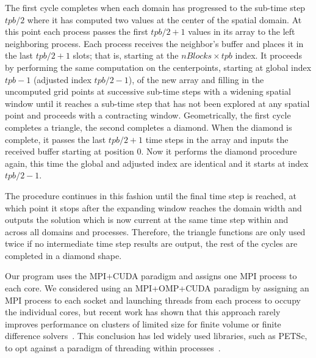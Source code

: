 The first cycle completes when each domain has progressed to the sub-time step $tpb/2$
where it has computed two values at the center of the spatial domain.
At this point each process passes the first $tpb/2 + 1$ values in its array to the left neighboring process.
Each process receives the neighbor's buffer and places it in the last $tpb/2 + 1$ slots; that is, starting at the $nBlocks \times tpb$ index.
It proceeds by performing the same computation on the centerpoints, starting at global index $tpb-1$ (adjusted index $tpb/2-1$), of the new array and filling in the uncomputed grid points at successive sub-time steps with a widening spatial window until it reaches a sub-time step that has not been explored at any spatial point and proceeds with a contracting window.
Geometrically, the first cycle completes a triangle, the second completes a diamond.
When the diamond is complete, it passes the last $tpb/2 + 1$ time steps in the array and inputs the received buffer starting at position 0.
Now it performs the diamond procedure again, this time the global and adjusted index are identical and it starts at index $tpb/2 - 1$.

The procedure continues in this fashion until the final time step is reached, at which point it stops after the expanding window reaches the domain width and outputs the solution which is now current at the same time step within and across all domains and processes.
Therefore, the triangle functions are only used twice if no intermediate time step results are output, the rest of the cycles are completed in a diamond shape.

Our program uses the MPI\allowbreak+CUDA paradigm and assigns one MPI process to each core.
We considered using an MPI\allowbreak+OMP\allowbreak+CUDA paradigm by assigning an MPI process to each socket and
launching threads from each process to occupy the individual cores, but recent work has shown that
this approach rarely improves performance on clusters of limited size for finite volume or finite
difference solvers~\cite{IDAHO_MPI_CUDA, PerfAnalysisHetero}.
This conclusion has led widely used libraries, such as PETSc, to opt against a paradigm of threading
within processes~\cite{MillsPetsc}.
